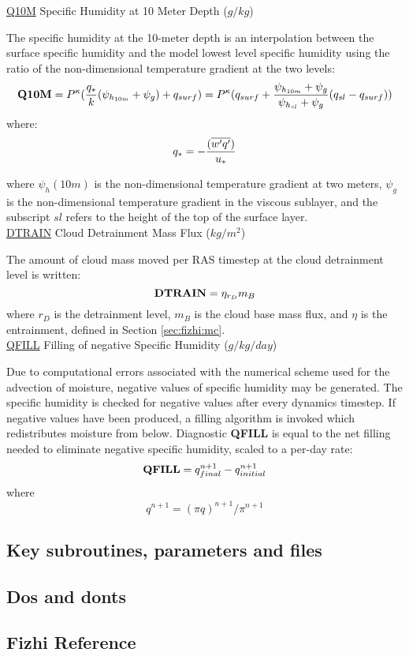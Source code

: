 \noindent
{ \underline {Q10M}  Specific Humidity at 10 Meter Depth ($g/kg$) }

\noindent
The specific humidity at the 10-meter depth is an interpolation between the surface specific 
humidity and the model lowest level specific humidity using the ratio of the 
non-dimensional temperature gradient at the two levels:
\[
{\bf Q10M} = P^{\kappa} ({q_* \over k} ({\psi_{h_{10m}}+\psi_g}) + q_{surf} ) = 
P^{\kappa}(q_{surf} + { {\psi_{h_{10m}}+\psi_g} \over {{\psi_{h_{sl}}+\psi_g}} }
(q_{sl} - q_{surf})) 
\]
where:
\[
q_* =  - { (\overline{w^{\prime}q^{\prime}}) \over {u_*} }
\]

\noindent
where $\psi_h(10m)$ is the non-dimensional temperature gradient at two meters, $\psi_g$ is
the non-dimensional temperature gradient in the viscous sublayer, and the subscript
$sl$ refers to the height of the top of the surface layer.
\\
 
\noindent
{ \underline {DTRAIN} Cloud Detrainment Mass Flux ($kg/m^2$) } 

The amount of cloud mass moved per RAS timestep at the cloud detrainment level is written:
\[
{\bf DTRAIN} = \eta_{r_D}m_B
\]
\noindent
where $r_D$ is the detrainment level, 
$m_B$ is the cloud base mass flux, and $\eta$
is the entrainment, defined in Section \ref{sec:fizhi:mc}.
\\

\noindent
{ \underline {QFILL}  Filling of negative Specific Humidity ($g/kg/day$) }

\noindent
Due to computational errors associated with the numerical scheme used for
the advection of moisture, negative values of specific humidity may be generated.  The
specific humidity is checked for negative values after every dynamics timestep.  If negative
values have been produced, a filling algorithm is invoked which redistributes moisture from
below.  Diagnostic {\bf QFILL} is equal to the net filling needed
to eliminate negative specific humidity, scaled to a per-day rate:
\[
{\bf QFILL} = q^{n+1}_{final} - q^{n+1}_{initial}
\]
where
\[
q^{n+1} = (\pi q)^{n+1} / \pi^{n+1}
\]


\subsection{Key subroutines, parameters and files}

\subsection{Dos and donts}

\subsection{Fizhi Reference}
